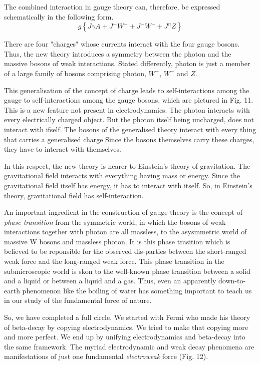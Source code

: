 The combined interaction in gauge theory can, therefore, be expressed schematically in the following form.
$$
g \left\{J \gamma A + J^{+} W^{-} + J^{-} W^{+} + J^{n} Z \right\}
$$

There are four "charges" whose currents interact with the four gauge bosons. Thus, the new theory introduces a symmetry between the photon and the massive bosons of weak interactions. Stated differently, photon is just a member of a large family of bosons comprising photon, $W^{+}$, $W^{-}$ and $Z$.

This generalisation of the concept of charge leads to self-interactions among the gauge to self-interactions among the gauge bosons, which are pictured in Fig. 11. This is a new feature not present in electrodynamics. The photon interacts with every electrically charged object. But the photon itself being uncharged, does not interact with ifself. The bosons of the generalised theory interact with every thing that carries a generalised charge Since the bosons themselves carry these charges, they have to interact with themselves.

In this respect, the new theory is nearer to Einstein's theory of gravitation. The gravitational field interacts with everything having mass or energy. Since the gravitational field itself has energy, it has to interact with itself. So, in Einstein's theory, gravitational field has self-interaction.

An important ingredient in the construction of gauge theory is the concept of {\it phase transition} from the symmetric world, in which the bosons of weak interactions together with photon are all massless, to the asysmmetric world of massive W bosons and massless photon. It is this phase trasition which is believed to be reponsible for the observed dis-parties between the short-ranged weak force and the long-ranged weak force. This phase transition in the submicroscopic world is skon to the well-known  phase transition between a solid and a liquid or between a liquid and a gas. Thus, even an apparently down-to-earth phenomenon like the boiling of water has something important to teach us in our study of the fundamental force of nature.

So, we have completed a full circle. We started with Fermi who made his theory of beta-decay by copying electrodynamics. We tried to make that copying more and more perfect. We end up by unifying electrodynamics and beta-decay into the same framework. The myriad electrodynamic and weak decay phenomena are manifestations of just one fundamental {\it electroweak} force (Fig. 12).

